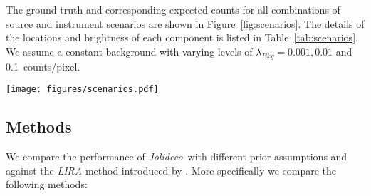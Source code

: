 \documentclass[twocolumn]{aastex631}
\newcommand{\chandra}{\textit{Chandra}~}
\newcommand{\xmm}{\textit{XMM}~}
\newcommand{\jolideco}{\textit{Jolideco}~}
\newcommand{\dvd}[1]{{\color{red} [DvD: #1]}}
\begin{document}

    
    The ground truth and corresponding expected counts for all combinations of source and instrument scenarios are shown in Figure~\ref{fig:scenarios}. The details of the locations and brightness of each component is listed in Table~\ref{tab:scenarios}. 
    We assume a constant background with varying levels of $\lambda_{Bkg}= 0.001, 0.01$ and \qty[mode = text]{0.1}{counts/pixel}. 

    \begin{figure*}
        \centering\texttt{[image: figures/scenarios.pdf]}
        \caption{Illustration of the expected counts for the different source scenarios we used to generate test datasets. The source patterns shown are for the {\sl (A)}  {\tt points}, {\sl (B) {\tt asterism}}, {\sl (C)} {\tt shield}, and {\sl (D)} {\tt spiral} cases (see Section~\ref{sec:testmodels}). For the instrument scenario \chandra we convolve the ground truth image with a narrow Gaussian shaped PSF of width $\sigma=2$~pix. For the scenario \xmm we used a Gaussian shaped PSF with a width of $\sigma=2$~pix \dvd{same as \chandra?} and an effective area that is five times larger than that of \chandra. All images are of size $128{\times}128$ pixels.
        }
        \label{fig:scenarios}
    \end{figure*}
     
    \subsection{Methods}
    \label{subsec:methods}
    We compare the performance of \jolideco with different prior assumptions and against the \textit{LIRA} method introduced by \cite{Esch2004}. More specifically we compare the following methods:
\end{document}
